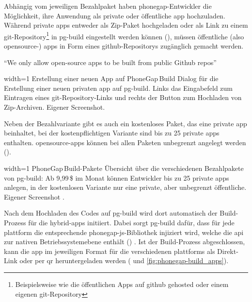 {Abhängig vom jeweiligen Bezahlpaket haben \gls{phonegap}-Entwickler die Möglichkeit, ihre Anwendung als private oder öffentliche \gls{app} hochzuladen. 
Während private \glspl{app} entweder als Zip-Paket hochgeladen oder als Link zu einem \gls{git}-Repository\footnote{Beispielsweise wie die öffentlichen Apps auf \gls{github} gehosted oder einem eigenen \gls{git}-Repository} in \gls{pg-build} eingestellt werden können (), müssen öffentliche (also \gls{opensource}-) \glspl{app} in Form eines \gls{github}-Repositorys zugänglich gemacht werden.

\begin{quoting}
\enquote{We only allow open-source apps to be built from public Github repos}~\cite{PhoneGap_Build_Apps}
\end{quoting}


	{width=1\textwidth}
	{Erstellung einer neuen App auf PhoneGap\,Build}
		{Dialog für die Erstellung einer neuen privaten \gls{app} auf \gls{pg-build}. Links das Eingabefeld zum Eintragen eines \gls{git}-Repository-Links und rechts der Button zum Hochladen von Zip-Archiven.}
	{Eigener Screenshot.}

Neben der Bezahlvariante gibt es auch ein kostenloses Paket, das eine private \gls{app} beinhaltet, bei der kostenpflichtigen Variante sind bis zu 25 private \glspl{app} enthalten.
\gls{opensource}-\glspl{app} können bei allen Paketen unbegrenzt angelegt werden ().

	{width=1\textwidth}
	{PhoneGap\,Build-Pakete}
		{Übersicht über die verschiedenen Bezahlpakete von \gls{pg-build}: Ab 9,99\,\$ im Monat können Entwickler bis zu 25 private \glspl{app} anlegen, in der kostenlosen Variante nur eine private, aber unbegrenzt öffentliche.}
	{Eigener Screenshot \cite{Adobe_PhoneGap_Build_Plans}.}

Nach dem Hochladen des Codes auf \gls{pg-build} wird dort automatisch der Build-Prozess für die \glspl{hybrid-app} initiiert.
Dabei sorgt \gls{pg-build} dafür, dass für jede \gls{plattform} die entsprechende \gls{phonegap}-\gls{js}-Bibliothek %
 injiziert wird, welche die \gls{api} zur nativen Betriebssystemebene enthält () \cite{PhoneGap_Build_Documentation_getting-started}.
Ist der Build-Prozess abgeschlossen, kann die \gls{app} im jeweiligen Format für die verschiedenen \glspl{plattform} als Direkt-Link oder per \gls{qr} heruntergeladen werden ( und \ref{fig:phonegap-build_apps}).


}
